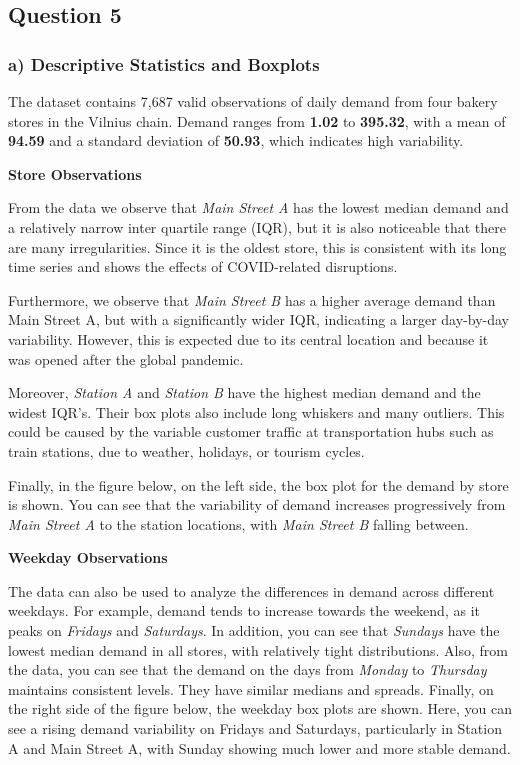 \documentclass{article}
\title{}
\author{}
\date{}
\begin{document}
\subsection*{Question 5} \bigskip

\subsubsection*{a) Descriptive Statistics and Boxplots}
\bigskip
The dataset contains 7,687 valid observations of daily demand from four bakery stores in the Vilnius chain. Demand ranges from \textbf{1.02} to \textbf{395.32}, with a mean of \textbf{94.59} and a standard deviation of \textbf{50.93}, which indicates high variability.

\bigskip
\noindent\textbf{Store Observations}

From the data we observe that \emph{Main Street A} has the lowest median demand and a relatively narrow inter quartile range (IQR), but it is also noticeable that there are many irregularities. Since it is the oldest store, this is consistent with its long time series and shows the effects of COVID-related disruptions.

Furthermore, we observe that \emph{Main Street B} has a higher average demand than Main Street A, but with a significantly wider IQR, indicating a larger day-by-day variability. However, this is expected due to its central location and because it was opened after the global pandemic.

Moreover, \emph{Station A} and \emph{Station B} have the highest median demand and the widest IQR's. Their box plots also include long whiskers and many outliers. This could be caused by the variable customer traffic at transportation hubs such as train stations, due to weather, holidays, or tourism cycles.

Finally, in the figure below, on the left side, the box plot for the demand by store is shown. You can see that the variability of demand increases progressively from \emph{Main Street A} to the station locations, with \emph{Main Street B} falling between. 

\bigskip
\noindent\textbf{Weekday Observations}

The data can also be used to analyze the differences in demand across different weekdays. For example, demand tends to increase towards the weekend, as it peaks on \emph{Fridays} and \emph{Saturdays}. 
 In addition, you can see that \emph{Sundays} have the lowest median demand in all stores, with relatively tight distributions.
 Also, from the data, you can see that the demand on the days from \emph{Monday} to \emph{Thursday} maintains consistent levels. They have similar medians and spreads.
 Finally, on the right side of the figure below, the weekday box plots are shown. Here, you can see a rising demand variability on Fridays and Saturdays, particularly in Station A and Main Street A, with Sunday showing much lower and more stable demand.
\end{document}
